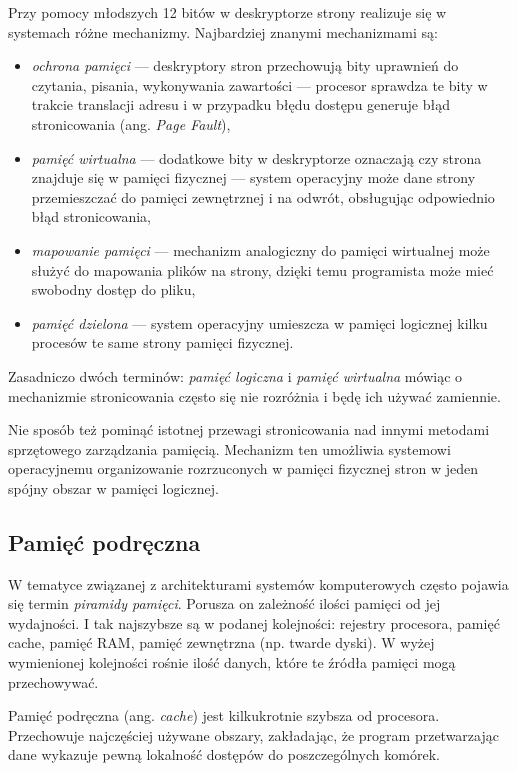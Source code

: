 \documentclass[12pt,a4paper,titlepage,twoside]{mwart}
\begin{document}
Przy pomocy młodszych 12 bitów w deskryptorze strony realizuje się w systemach
różne mechanizmy. Najbardziej znanymi mechanizmami są:
\begin{itemize}
\item \textit{ochrona pamięci} --- deskryptory stron przechowują bity uprawnień do
czytania, pisania, wykonywania zawartości --- procesor sprawdza te bity w
trakcie translacji adresu i w przypadku błędu dostępu generuje błąd
stronicowania (ang. \textit{Page Fault}),
\item \textit{pamięć wirtualna} --- dodatkowe bity w deskryptorze oznaczają czy
strona znajduje się w pamięci fizycznej --- system operacyjny może dane strony
przemieszczać do pamięci zewnętrznej i na odwrót, obsługując odpowiednio błąd
stronicowania,
\item \textit{mapowanie pamięci} --- mechanizm analogiczny do pamięci wirtualnej
może służyć do mapowania plików na strony, dzięki temu programista może mieć
swobodny dostęp do pliku,
\item \textit{pamięć dzielona} --- system operacyjny umieszcza w pamięci logicznej kilku
procesów te same strony pamięci fizycznej.
\end{itemize}

Zasadniczo dwóch terminów: \textit{pamięć logiczna} i \textit{pamięć wirtualna}
mówiąc o mechanizmie stronicowania często się nie rozróżnia i będę ich używać
zamiennie.

Nie sposób też pominąć istotnej przewagi stronicowania nad innymi metodami
sprzętowego zarządzania pamięcią. Mechanizm ten umożliwia systemowi
operacyjnemu organizowanie rozrzuconych w pamięci fizycznej stron w jeden
spójny obszar w pamięci logicznej.

\subsection{Pamięć podręczna}
\label{CacheMemory}

W tematyce związanej z architekturami systemów komputerowych często pojawia się
termin \textit{piramidy pamięci}. Porusza on zależność ilości pamięci od jej
wydajności. I tak najszybsze są w podanej kolejności: rejestry procesora,
pamięć cache, pamięć RAM, pamięć zewnętrzna (np. twarde dyski). W wyżej
wymienionej kolejności rośnie ilość danych, które te źródła pamięci mogą
przechowywać.

Pamięć podręczna (ang. \textit{cache}) jest kilkukrotnie szybsza od procesora.
Przechowuje najczęściej używane obszary, zakładając, że program przetwarzając
dane wykazuje pewną lokalność dostępów do poszczególnych komórek.
\end{document}
